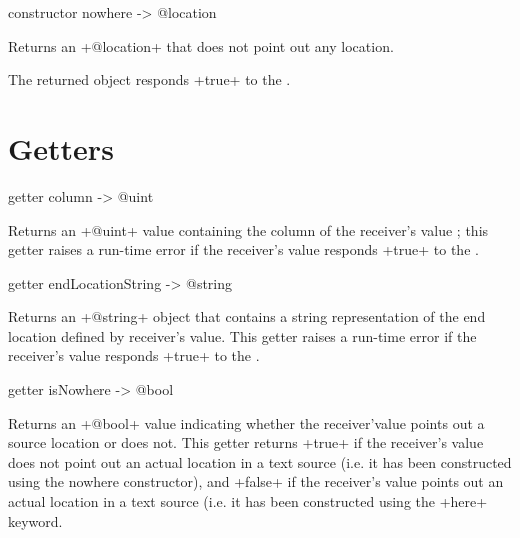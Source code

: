 
\begin{galgas}
constructor nowhere -> @location
\end{galgas}


Returns an \ggs+@location+ that does not point out any location.

The returned object responds \ggs+true+ to the .





\section{Getters}



\begin{galgas}
getter column -> @uint
\end{galgas}

Returns an \ggs+@uint+ value containing the column of the receiver's value ; this getter raises a run-time error if the receiver's value responds \ggs+true+ to the .




\begin{galgas}
getter endLocationString -> @string
\end{galgas}

Returns an \ggs+@string+ object that contains a string representation of the end location defined by receiver's value. This getter raises a run-time error if the receiver's value responds \ggs+true+ to the .



\begin{galgas}
getter isNowhere -> @bool
\end{galgas}

Returns an \ggs+@bool+ value indicating whether the receiver'value points out a source location or does not. This getter returns \ggs+true+ if the receiver's value does not point out an actual location in a text source (i.e. it has been constructed using the nowhere constructor), and \ggs+false+ if the receiver's value points out an actual location in a text source (i.e. it has been constructed using the \ggs+here+ keyword.


